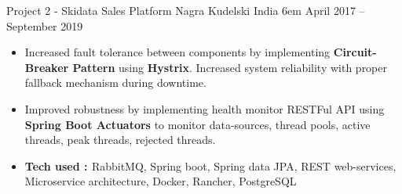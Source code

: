 \documentclass[9.5pt,a4paper]{altacv}
\begin{document}
\divider


\cvprojects
{Project 2 - Skidata Sales Platform}
{Nagra Kudelski India}
{6em}
{April 2017 -- September 2019}

\begin{itemize}

    
    \item
    Increased fault tolerance between components by implementing \textbf{Circuit-Breaker Pattern} using \textbf{Hystrix}. Increased system reliability with proper fallback mechanism during downtime.
    
    \item
    Improved robustness by implementing health monitor RESTFul API using \textbf{Spring Boot Actuators} to monitor data-sources, thread pools, active threads, peak threads, rejected threads.
    
    \item \textbf{\textcolor{accent}{Tech used : }} 
    \textcolor{accent}{
    RabbitMQ, Spring boot, Spring data JPA, REST web-services, Microservice architecture, Docker, Rancher, PostgreSQL}

\end{itemize}





\end{document}
